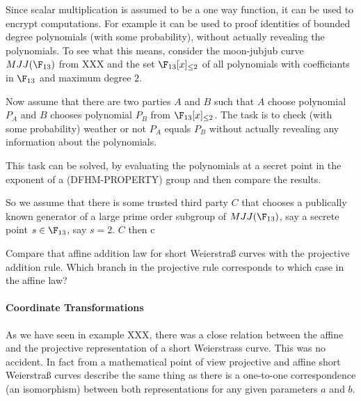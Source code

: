 \begin{example}
Since scalar multiplication is assumed to be a one way function, it can be used to encrypt computations. For example it can be used to proof identities of bounded degree polynomials (with some probability), without actually revealing the polynomials. To see what this means, consider the moon-jubjub curve $MJJ(\F_{13})$ from XXX and the set $\F_{13}[x]_{\leq 2}$ of all polynomials with coefficiants in $\F_{13}$ and maximum degree $2$.

Now assume that there are two parties $A$ and $B$ such that $A$ choose polynomial $P_A$ and $B$ chooses polynomial $P_B$ from $\F_{13}[x]_{\leq 2}$. The task is to check (with some probability) weather or not $P_A$ equals $P_B$ without actually revealing any information about the polynomials. 

This task can be solved, by evaluating the polynomials at a secret point in the exponent of a (DFHM-PROPERTY) group and then compare the results.

So we assume that there is some trusted third party $C$ that chooses a publically known generator of a large prime order subgroup of $MJJ(\F_{13})$, say  a secrete point $s\in\F_{13}$, say $s=2$. $C$ then c
\end{example}


\begin{exercise}
Compare that affine addition law for short Weierstraß curves with the projective addition rule. Which branch in the projective rule corresponds to which case in the affine law? 
\end{exercise}

\paragraph{Coordinate Transformations} As we have seen in example XXX, there was a close relation between the affine and the projective representation of a short Weierstrass curve. This was no accident.
In fact from a mathematical point of view projective and affine short Weierstraß curves describe the same thing as there is a one-to-one correspondence (an isomorphism) between both representations for any given parameters $a$ and $b$. 


